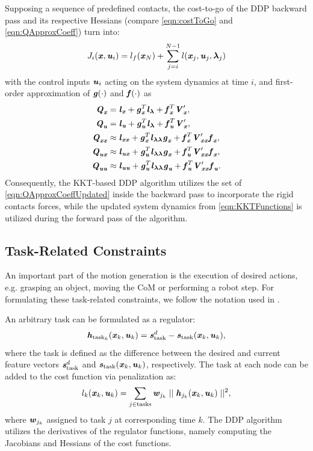 Supposing a sequence of predefined contacts, the cost-to-go of the \gls{DDP} backward pass and its respective Hessians (compare \cref{eqn:costToGo} and \cref{eqn:QApproxCoeff}) turn into:
\begin{equation*}\label{eqn:CostToGoUpdated}
J_i(\bm{\mathit{x}}, \bm{\mathit{u}}_i)=l_f(\bm{\mathit{x}}_N)+\sum_{j=i}^{N-1}l(\bm{\mathit{x}}_j,\bm{\mathit{u}}_j,\bm{\mathit{\lambda}}_j)
\end{equation*}
with the control inputs $\bm{\mathit{u}}_i$ acting on the system dynamics at time $i$, and first-order approximation of $\bm{\mathit{g}}(\cdot)$ and $\bm{\mathit{f}}(\cdot)$ as
\begin{align}\label{eqn:QApproxCoeffUpdated}
\begin{split}
\bm{\mathit{Q}}_{\bm{\mathit{x}}} &= \bm{\mathit{l}}_{\bm{\mathit{x}}}+\bm{\mathit{g}}_{\bm{\mathit{x}}}^T\bm{\mathit{l}}_{\bm{\mathit{\lambda}}}+\bm{\mathit{f}}_{\bm{\mathit{x}}}^T \bm{\mathit{V}}_{\bm{\mathit{x}}}^\prime, \\
\bm{\mathit{Q}}_{\bm{\mathit{u}}} &= \bm{\mathit{l}}_{\bm{\mathit{u}}}+\bm{\mathit{g}}_{\bm{\mathit{u}}}^T\bm{\mathit{l}}_{\bm{\mathit{\lambda}}}+\bm{\mathit{f}}_{\bm{\mathit{u}}}^T \bm{\mathit{V}}_{\bm{\mathit{x}}}^\prime, \\
\bm{\mathit{Q}}_{\bm{\mathit{x}}\bm{\mathit{x}}} &\approx \bm{\mathit{l}}_{\bm{\mathit{x}}\bm{\mathit{x}}}+\bm{\mathit{g}}_{\bm{\mathit{x}}}^T\bm{\mathit{l}}_{\bm{\mathit{\lambda\lambda}}}\bm{\mathit{g}}_{\bm{\mathit{x}}}+\bm{\mathit{f}}_{\bm{\mathit{x}}}^T \bm{\mathit{V}}_{\bm{\mathit{x}}\bm{\mathit{x}}}^\prime\bm{\mathit{f}}_{\bm{\mathit{x}}},\\
\bm{\mathit{Q}}_{\bm{\mathit{u}}\bm{\mathit{x}}} &\approx \bm{\mathit{l}}_{\bm{\mathit{u}}\bm{\mathit{x}}}+\bm{\mathit{g}}_{\bm{\mathit{u}}}^T\bm{\mathit{l}}_{\bm{\mathit{\lambda\lambda}}}\bm{\mathit{g}}_{\bm{\mathit{x}}}+\bm{\mathit{f}}_{\bm{\mathit{u}}}^T \bm{\mathit{V}}_{\bm{\mathit{x}}\bm{\mathit{x}}}^\prime\bm{\mathit{f}}_{\bm{\mathit{x}}},\\
\bm{\mathit{Q}}_{\bm{\mathit{u}}\bm{\mathit{u}}} &\approx \bm{\mathit{l}}_{\bm{\mathit{u}}\bm{\mathit{u}}}+\bm{\mathit{g}}_{\bm{\mathit{u}}}^T\bm{\mathit{l}}_{\bm{\mathit{\lambda\lambda}}}\bm{\mathit{g}}_{\bm{\mathit{u}}}+\bm{\mathit{f}}_{\bm{\mathit{u}}}^T \bm{\mathit{V}}_{\bm{\mathit{x}}\bm{\mathit{x}}}^\prime\bm{\mathit{f}}_{\bm{\mathit{u}}}.
\end{split}
\end{align}
Consequently, the \gls{KKT}-based \gls{DDP} algorithm utilizes the set of \cref{eqn:QApproxCoeffUpdated} inside the backward pass to incorporate the rigid contacts forces, while the updated system dynamics from \cref{eqn:KKTFunctions} is utilized during the forward pass of the algorithm. 

\subsection{Task-Related Constraints}
An important part of the motion generation is the execution of desired actions, e.g. grasping an object, moving the \gls{CoM} or performing a robot step. For formulating these task-related constraints, we follow the notation used in \cite{giraud2020motion}.

An arbitrary task can be formulated as a regulator: 
\begin{equation*} 
\bm{\mathit{h}}_{\text{task}_k}(\bm{\mathit{x}}_k,\bm{\mathit{u}}_k)=\bm{\mathit{s}}_{\text{task}}^d-\bm{\mathit{s}}_{\text{task}}(\bm{\mathit{x}}_k,\bm{\mathit{u}}_k),
\end{equation*}   
where the task is defined as the difference between the desired and current feature vectors $\bm{\mathit{s}}_{\text{task}}^d$ and $\bm{\mathit{s}}_{\text{task}}(\bm{\mathit{x}}_k,\bm{\mathit{u}}_k)$, respectively. The task at each node can be added to the cost function via penalization as: 
\begin{equation*} 
l_k(\bm{\mathit{x}}_k,\bm{\mathit{u}}_k)=\sum_{j\in \text{tasks}}\bm{\mathit{w}}_{j_k}\mid\mid\bm{\mathit{h}}_{j_k}(\bm{\mathit{x}}_k,\bm{\mathit{u}}_k)\mid\mid^2,
\end{equation*}  
where $\bm{\mathit{w}}_{j_k}$ assigned to task $j$ at corresponding time $k$. The \gls{DDP} algorithm utilizes the derivatives of the regulator functions, namely computing the Jacobians and Hessians of the cost functions. 

